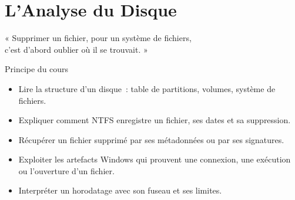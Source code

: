 
\chapter{L'Analyse du Disque}
\label{chap:disque}

\epigraph{%
    « Supprimer un fichier, pour un système de fichiers,\\
    c'est d'abord oublier où il se trouvait. »%
}{Principe du cours}


\begin{boxobjectifs}
\begin{itemize}
    \item Lire la structure d'un disque~: table de partitions, volumes,
          système de fichiers.
    \item Expliquer comment NTFS enregistre un fichier, ses dates et sa
          suppression.
    \item Récupérer un fichier supprimé par ses métadonnées ou par ses
          signatures.
    \item Exploiter les artefacts Windows qui prouvent une connexion, une
          exécution ou l'ouverture d'un fichier.
    \item Interpréter un horodatage avec son fuseau et ses limites.
\end{itemize}
\end{boxobjectifs}

\bigskip

